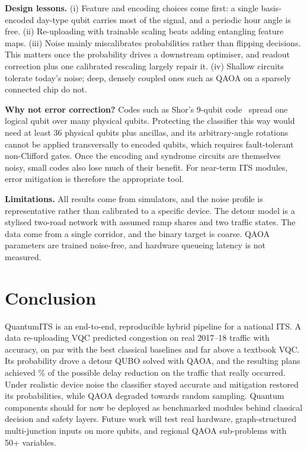 \documentclass[conference]{IEEEtran}
\begin{document}
\textbf{Design lessons.} (i) Feature and encoding choices come first: a single basis-encoded day-type qubit carries most of the signal, and a periodic hour angle is free. (ii) Re-uploading with trainable scaling beats adding entangling feature maps. (iii) Noise mainly miscalibrates probabilities rather than flipping decisions. This matters once the probability drives a downstream optimiser, and readout correction plus one calibrated rescaling largely repair it. (iv) Shallow circuits tolerate today's noise; deep, densely coupled ones such as QAOA on a sparsely connected chip do not.

\textbf{Why not error correction?} Codes such as Shor's 9-qubit code~\cite{shor1995scheme} spread one logical qubit over many physical qubits. Protecting the classifier this way would need at least 36 physical qubits plus ancillas, and its arbitrary-angle rotations cannot be applied transversally to encoded qubits, which requires fault-tolerant non-Clifford gates. Once the encoding and syndrome circuits are themselves noisy, small codes also lose much of their benefit. For near-term ITS modules, error mitigation is therefore the appropriate tool.

\textbf{Limitations.} All results come from simulators, and the noise profile is representative rather than calibrated to a specific device. The detour model is a stylised two-road network with assumed ramp shares and two traffic states. The data come from a single corridor, and the binary target is coarse. QAOA parameters are trained noise-free, and hardware queueing latency is not measured.

\section{Conclusion}
QuantumITS is an end-to-end, reproducible hybrid pipeline for a national ITS. A data re-uploading VQC predicted congestion on real 2017--18 traffic with \accOursM{} accuracy, on par with the best classical baselines and far above a textbook VQC. Its probability drove a detour QUBO solved with QAOA, and the resulting plans achieved \eeOurs\% of the possible delay reduction on the traffic that really occurred. Under realistic device noise the classifier stayed accurate and mitigation restored its probabilities, while QAOA degraded towards random sampling. Quantum components should for now be deployed as benchmarked modules behind classical decision and safety layers. Future work will test real hardware, graph-structured multi-junction inputs on more qubits, and regional QAOA sub-problems with 50+ variables.
\end{document}
